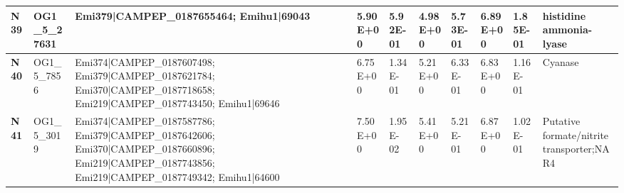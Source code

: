 \begin{landscape}
\begin{center}
\begin{footnotesize}
\begin{longtable}{|p{0.5cm}|p{1.5cm}|p{4cm}|l|l|l|l|l|l|l|}
\textbf{N39} & OG1\_5\_27631 & Emi379|CAMPEP\_0187655464; Emihu1|69043                                                                                                                                                                                                                                                                                                                                                                                                                                                                                                                                                                                                  & 5.90E+00  & 5.92E-01 & 4.98E+00  & 5.73E-01 & 6.89E+00  & 1.85E-01 & histidine ammonia-lyase                                                      \\ \hline
\textbf{N40} & OG1\_5\_7856  & Emi374|CAMPEP\_0187607498; Emi379|CAMPEP\_0187621784; Emi370|CAMPEP\_0187718658; Emi219|CAMPEP\_0187743450; Emihu1|69646                                                                                                                                                                                                                                                                                                                                                                                                                                                                                                                 & 6.75E+00  & 1.34E-01 & 5.21E+00  & 6.33E-01 & 6.83E+00  & 1.16E-01 & Cyanase                                                                      \\ \hline
\textbf{N41} & OG1\_5\_3019  & Emi374|CAMPEP\_0187587786; Emi379|CAMPEP\_0187642606; Emi370|CAMPEP\_0187660896; Emi219|CAMPEP\_0187743856; Emi219|CAMPEP\_0187749342; Emihu1|64600                                                                                                                                                                                                                                                                                                                                                                                                                                                                                      & 7.50E+00  & 1.95E-02 & 5.41E+00  & 5.21E-01 & 6.87E+00  & 1.02E-01 & Putative formate/nitrite transporter;NAR4                                    \\ \hline

\end{longtable}
\end{footnotesize}
\end{center}
\end{landscape}
